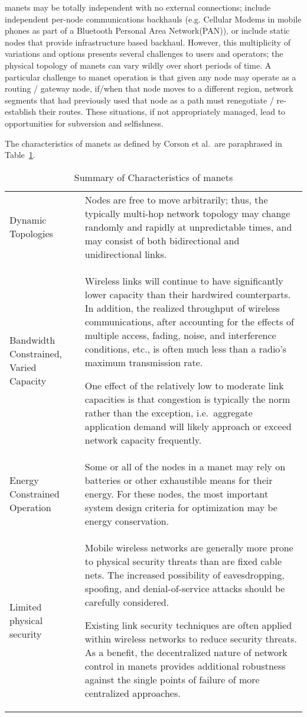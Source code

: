 \glspl{manet} may be totally independent with no external connections; include independent per-node communications backhauls (e.g. Cellular Modems in mobile phones as part of a Bluetooth Personal Area Network(PAN)), or include static nodes that provide infrastructure based backhaul.
However, this multiplicity of variations and options presents several challenges to users and operators; the physical topology of \glspl{manet} can vary wildly over short periods of time.
A particular challenge to \gls{manet} operation is that given any node may operate as a routing / gateway node, if/when that node moves to a different region, network segments that had previously used that node as a path must renegotiate / re-establish their routes.
These situations, if not appropriately managed, lead to opportunities for subversion and selfishness.

The characteristics of \gls{manet}s as defined by Corson et al.\ are paraphrased in Table~\ref{tab:manet_characteristics}.

\begin{table}[h!]
\caption[Summary of Characteristics of \gls{manet}s]{Summary of Characteristics of \gls{manet}s\cite{Corson1999}}
\label{tab:manet_characteristics}
  \begin{tabularx}{\textwidth}{p{2cm}X}\toprule
    Dynamic Topologies & Nodes are free to move arbitrarily; thus, the typically multi-hop network topology may change randomly and rapidly at unpredictable times, and may consist of both bidirectional and unidirectional links.
\\
    Bandwidth Constrained, Varied Capacity & Wireless links will continue to have significantly lower capacity than their hardwired counterparts.
In addition, the realized throughput of wireless communications, after accounting for the effects of multiple access, fading, noise, and interference conditions, etc., is often much less than a radio's maximum transmission rate.
\par
One effect of the relatively low to moderate link capacities is that congestion is typically the norm rather than the exception, i.e.\  aggregate application demand will likely approach or exceed network capacity frequently.\\
    Energy Constrained Operation &  Some or all of the nodes in a \gls{manet} may rely on batteries or other exhaustible means for their energy.
For these nodes, the most important system design criteria for optimization may be energy conservation.\\
    Limited physical security & Mobile wireless networks are generally more prone to physical security threats than are fixed cable nets.
The increased possibility of eavesdropping, spoofing, and denial-of-service attacks should be carefully considered.\par
Existing link security techniques are often applied within wireless networks to reduce security threats.
As a benefit, the decentralized nature of network control in \glspl{manet} provides additional robustness against the single points of failure of more centralized approaches.\\\bottomrule
\end{tabularx}
\end{table}

